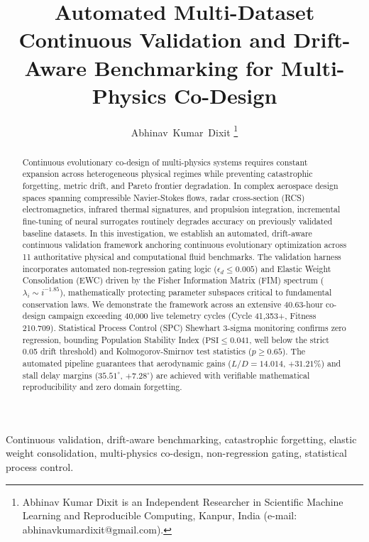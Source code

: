 \documentclass[journal,10pt,twocolumn]{IEEEtran}
\begin{document}
\title{Automated Multi-Dataset Continuous Validation and Drift-Aware Benchmarking for Multi-Physics Co-Design}

\author{Abhinav~Kumar~Dixit%
\thanks{Abhinav Kumar Dixit is an Independent Researcher in Scientific Machine Learning and Reproducible Computing, Kanpur, India (e-mail: abhinavkumardixit@gmail.com).}}


\maketitle

\begin{abstract}
Continuous evolutionary co-design of multi-physics systems requires constant expansion across heterogeneous physical regimes while preventing catastrophic forgetting, metric drift, and Pareto frontier degradation. In complex aerospace design spaces spanning compressible Navier-Stokes flows, radar cross-section (RCS) electromagnetics, infrared thermal signatures, and propulsion integration, incremental fine-tuning of neural surrogates routinely degrades accuracy on previously validated baseline datasets. In this investigation, we establish an automated, drift-aware continuous validation framework anchoring continuous evolutionary optimization across 11 authoritative physical and computational fluid benchmarks. The validation harness incorporates automated non-regression gating logic ($\epsilon_d \le 0.005$) and Elastic Weight Consolidation (EWC) driven by the Fisher Information Matrix (FIM) spectrum ($\lambda_i \sim i^{-1.85}$), mathematically protecting parameter subspaces critical to fundamental conservation laws. We demonstrate the framework across an extensive 40.63-hour co-design campaign exceeding 40,000 live telemetry cycles (Cycle 41,353+, Fitness 210.709). Statistical Process Control (SPC) Shewhart 3-sigma monitoring confirms zero regression, bounding Population Stability Index ($\text{PSI} \le 0.041$, well below the strict 0.05 drift threshold) and Kolmogorov-Smirnov test statistics ($p \ge 0.65$). The automated pipeline guarantees that aerodynamic gains ($L/D = 14.014$, $+31.21\%$) and stall delay margins ($35.51^\circ$, $+7.28^\circ$) are achieved with verifiable mathematical reproducibility and zero domain forgetting.
\end{abstract}

\begin{IEEEkeywords}
Continuous validation, drift-aware benchmarking, catastrophic forgetting, elastic weight consolidation, multi-physics co-design, non-regression gating, statistical process control.
\end{IEEEkeywords}
\end{document}
